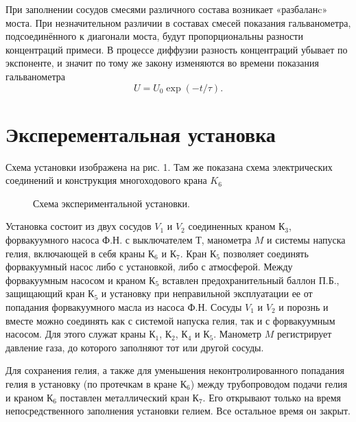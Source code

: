 \documentclass[12pt]{article}
\begin{document}
При заполнении сосудов смесями различного состава возникает «разбаланc» моста. При незначительном различии в составах смесей показания гальванометра, подсоединённого к диагонали моста, будут пропорциональны разности концентраций примеси. В процессе диффузии
разность концентраций убывает по экспоненте, и значит по тому же закону изменяются во времени показания гальванометра $$U=U_0 \exp(-t/\tau).$$
\section*{Эксперементальная установка}
Схема установки изображена на рис. 1. Там же показана схема электрических соединений и конструкция многоходового крана $K_6$

\begin{figure}[h]
    \caption{Схема экспериментальной установки.}
\end{figure}
Установка состоит из двух сосудов $V_1$ и $V_2$ соединенных краном $К_3$, форвакуумного насоса Ф.Н. с выключателем $Т$, манометра $M$ и системы напуска гелия, включающей в себя краны $К_6$ и $К_7$. Кран $К_5$ позволяет соединять форвакуумный насос либо с установкой, либо с атмосферой. Между форвакуумным насосом и краном $К_5$ вставлен предохранительный баллон П.Б., защищающий кран $К_5$ и установку при неправильной эксплуатации ее от попадания форвакуумного масла из насоса Ф.Н. Сосуды $V_1$ и $V_2$ и порознь и вместе можно соединять как с системой напуска гелия, так и с форвакуумным насосом. Для этого служат краны $К_1$, $К_2$, $К_4$ и $К_5$. Манометр  $M$
регистрирует давление газа, до которого заполняют тот или другой
сосуды.

Для сохранения гелия, а также для уменьшения неконтролированного попадания гелия в установку (по протечкам в кране $К_6$) между
трубопроводом подачи гелия и краном $К_6$ поставлен металлический
кран $К_7$. Его открывают только на время непосредственного заполнения установки гелием. Все остальное время он закрыт.
\end{document}
